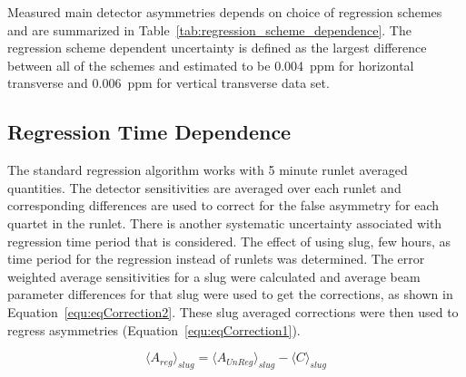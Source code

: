 Measured main detector asymmetries depends on choice of regression schemes and are summarized in Table~\ref{tab:regression_scheme_dependence}. The regression scheme dependent uncertainty is defined as the largest difference between all of the schemes and estimated to be 0.004~ppm for horizontal transverse and 0.006~ppm for vertical transverse data set.


\subsection{Regression Time Dependence}
\label{Regression Time Dependence}

The standard regression algorithm works with 5 minute runlet averaged quantities. The detector sensitivities are averaged over each runlet and corresponding differences are used to correct for the false asymmetry for each quartet in the runlet. There is another systematic uncertainty associated with regression time period that is considered.
The effect of using slug, few hours, as time period for the regression instead of runlets was determined. 
The error weighted average sensitivities for a slug were calculated and average beam parameter differences for that slug were used to get the corrections, as shown in Equation~\ref{equ:eqCorrection2}. These slug averaged corrections were then used to regress asymmetries (Equation~\ref{equ:eqCorrection1}). 

\begin{equation} \label{equ:eqCorrection1}
\langle A_{reg}\rangle_{slug} = \langle A_{UnReg}\rangle_{slug} - \langle C\rangle_{slug}
\end{equation}

